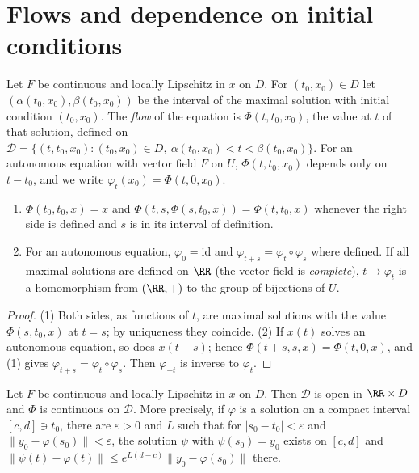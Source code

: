 \section{Flows and dependence on initial conditions}\label{ordinary-differential-equations:section-dependence}

\begin{definition}\label{ordinary-differential-equations:definition-flow}
Let $F$ be continuous and locally Lipschitz in $x$ on $D$. For $(t_0, x_0) \in D$ let $(\alpha(t_0, x_0), \beta(t_0, x_0))$ be the interval of the maximal solution with initial condition $(t_0, x_0)$. The \emph{flow} of the equation is
$\Phi(t, t_0, x_0)$, the value at $t$ of that solution, defined on
$\mathcal{D} = \{(t, t_0, x_0) : (t_0, x_0) \in D, \ \alpha(t_0, x_0) < t < \beta(t_0, x_0)\}$. For an autonomous equation with vector field $F$ on $U$, $\Phi(t, t_0, x_0)$ depends only on $t - t_0$, and we write
$\varphi_t(x_0) = \Phi(t, 0, x_0)$.
\end{definition}

\begin{proposition}\label{ordinary-differential-equations:proposition-flow-properties}
\begin{enumerate}
\item $\Phi(t_0, t_0, x) = x$ and $\Phi(t, s, \Phi(s, t_0, x)) = \Phi(t, t_0, x)$ whenever the right side is defined and $s$ is in its interval of definition.
\item For an autonomous equation, $\varphi_0 = \mathrm{id}$ and $\varphi_{t+s} = \varphi_t \circ \varphi_s$ where defined. If all maximal solutions are defined on $\RR$ (the vector field is \emph{complete}), $t \mapsto \varphi_t$ is a homomorphism
from $(\RR, +)$ to the group of bijections of $U$.
\end{enumerate}
\end{proposition}

\begin{proof}
(1) Both sides, as functions of $t$, are maximal solutions with the value $\Phi(s, t_0, x)$ at $t = s$; by uniqueness they coincide. (2) If $x(t)$ solves an autonomous equation, so does $x(t + s)$; hence
$\Phi(t + s, s, x) = \Phi(t, 0, x)$, and (1) gives $\varphi_{t+s} = \varphi_t \circ \varphi_s$. Then $\varphi_{-t}$ is inverse to $\varphi_t$.
\end{proof}

\begin{theorem}\label{ordinary-differential-equations:theorem-continuous-dependence}
Let $F$ be continuous and locally Lipschitz in $x$ on $D$. Then $\mathcal{D}$ is open in $\RR \times D$ and $\Phi$ is continuous on $\mathcal{D}$. More precisely, if $\varphi$ is a solution on a compact interval $[c, d] \ni t_0$, there are
$\varepsilon > 0$ and $L$ such that for $|s_0 - t_0| < \varepsilon$ and $\|y_0 - \varphi(s_0)\| < \varepsilon$, the solution $\psi$ with $\psi(s_0) = y_0$ exists on $[c, d]$ and $\|\psi(t) - \varphi(t)\| \leq e^{L(d - c)}\|y_0 - \varphi(s_0)\|$ there.
\end{theorem}

